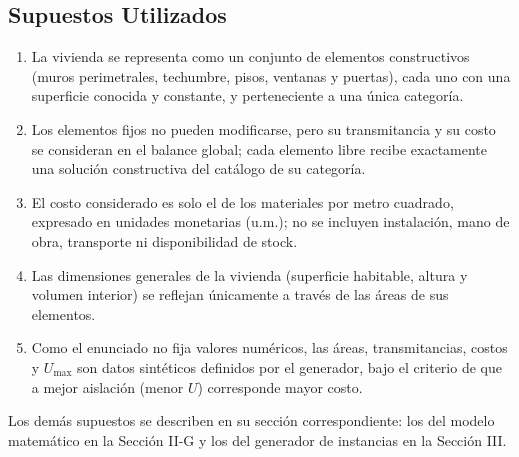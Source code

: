 \subsection{Supuestos Utilizados}
\begin{enumerate}
  \item La vivienda se representa como un conjunto de elementos constructivos
        (muros perimetrales, techumbre, pisos, ventanas y puertas), cada uno con
        una superficie conocida y constante, y perteneciente a una única categoría.
        
  \item Los elementos fijos no pueden modificarse, pero su transmitancia y su costo se consideran en el balance global; cada elemento libre recibe exactamente una solución constructiva del catálogo de su categoría.
  
  \item El costo considerado es solo el de los materiales por metro cuadrado, expresado en unidades monetarias (u.m.); no se incluyen           instalación, mano de obra, transporte ni disponibilidad de stock.
        
  \item Las dimensiones generales de la vivienda (superficie habitable, altura y
        volumen interior) se reflejan únicamente a través de las áreas de sus
        elementos.
        
  \item Como el enunciado no fija valores numéricos, las áreas, transmitancias,
        costos y $U_{\max}$ son datos sintéticos definidos por el generador, bajo el criterio de que a mejor aislación (menor $U$) corresponde mayor costo.\\
\end{enumerate}

Los demás supuestos se describen en su sección correspondiente: los del modelo
matemático en la Sección II-G y los del generador de instancias en la Sección III.
